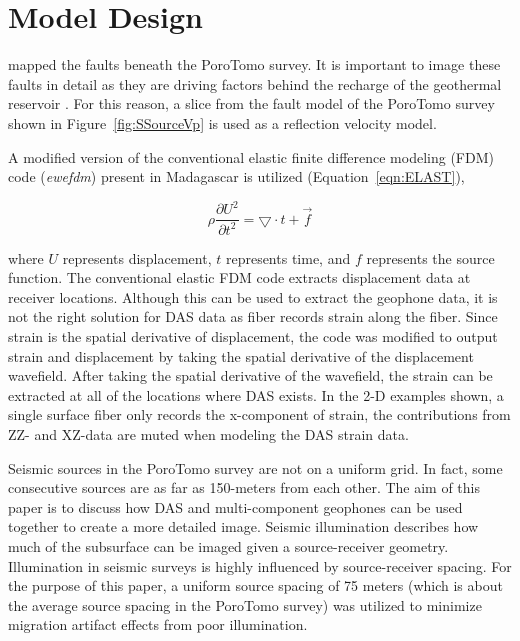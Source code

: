 \section{Model Design}
\citet{siler2013three} mapped the faults beneath the PoroTomo survey. It is important to image these faults in detail as they are driving factors behind the recharge of the geothermal reservoir \citep{feigl2017overview,folsomimaging}. For this reason, a slice from the fault model of the PoroTomo survey shown in Figure~\ref{fig:SSourceVp} is used as a reflection velocity model.


A modified version of the conventional elastic finite difference modeling (FDM) code (\textit{ewefdm}) present in Madagascar is utilized (Equation~\ref{eqn:ELAST}),

\begin{equation}
  \rho \frac{\partial U^2}{\partial t^2} = \bigtriangledown \cdot t + \overrightarrow{f}
\label{eqn:ELAST}
\end{equation}

where $U$ represents displacement, $t$ represents time, and $f$ represents the source function. The conventional elastic FDM code extracts displacement data at receiver locations. Although this can be used to extract the geophone data, it is not the right solution for DAS data as fiber records strain along the fiber. Since strain is the spatial derivative of displacement, the code was modified to output strain and displacement by taking the spatial derivative of the displacement wavefield. After taking the spatial derivative of the wavefield, the strain can be extracted at all of the locations where DAS exists. In the 2-D examples shown, a single surface fiber only records the x-component of strain, the contributions from ZZ- and XZ-data are muted when modeling the DAS strain data.

Seismic sources in the PoroTomo survey are not on a uniform grid. In fact, some consecutive sources are as far as 150-meters from each other. The aim of this paper is to discuss how DAS and multi-component geophones can be used together to create a more detailed image. Seismic illumination describes how much of the subsurface can be imaged given a source-receiver geometry. Illumination in seismic surveys is highly influenced by source-receiver spacing. For the purpose of this paper, a uniform source spacing of 75 meters (which is about the average source spacing in the PoroTomo survey) was utilized to minimize migration artifact effects from poor illumination.

